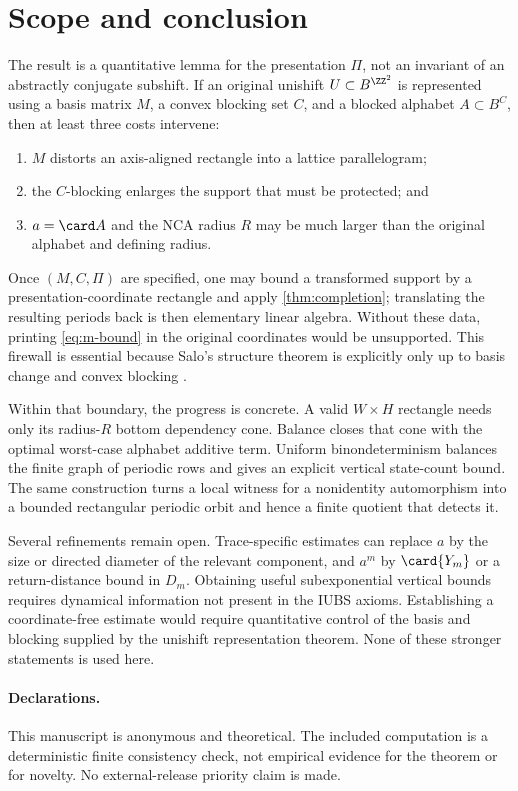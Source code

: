 \section{Scope and conclusion}\label{sec:conclusion}

The result is a quantitative lemma for the presentation $\Pi$, not an invariant of an abstractly conjugate subshift.  If an original unishift $U\subset B^{\ZZ^2}$ is represented using a basis matrix $M$, a convex blocking set $C$, and a blocked alphabet $A\subset B^C$, then at least three costs intervene:
\begin{enumerate}
\item $M$ distorts an axis-aligned rectangle into a lattice parallelogram;
\item the $C$-blocking enlarges the support that must be protected; and
\item $a=\card A$ and the NCA radius $R$ may be much larger than the original alphabet and defining radius.
\end{enumerate}
Once $(M,C,\Pi)$ are specified, one may bound a transformed support by a presentation-coordinate rectangle and apply \cref{thm:completion}; translating the resulting periods back is then elementary linear algebra.  Without these data, printing \eqref{eq:m-bound} in the original coordinates would be unsupported.  This firewall is essential because Salo's structure theorem is explicitly only up to basis change and convex blocking \citep{salo2025iubs}.

Within that boundary, the progress is concrete.  A valid $W\times H$ rectangle needs only its radius-$R$ bottom dependency cone.  Balance closes that cone with the optimal worst-case alphabet additive term.  Uniform binondeterminism balances the finite graph of periodic rows and gives an explicit vertical state-count bound.  The same construction turns a local witness for a nonidentity automorphism into a bounded rectangular periodic orbit and hence a finite quotient that detects it.

Several refinements remain open.  Trace-specific estimates can replace $a$ by the size or directed diameter of the relevant component, and $a^m$ by $\card{Y_m}$ or a return-distance bound in $D_m$.  Obtaining useful subexponential vertical bounds requires dynamical information not present in the IUBS axioms.  Establishing a coordinate-free estimate would require quantitative control of the basis and blocking supplied by the unishift representation theorem.  None of these stronger statements is used here.

\paragraph{Declarations.}
This manuscript is anonymous and theoretical.  The included computation is a deterministic finite consistency check, not empirical evidence for the theorem or for novelty.  No external-release priority claim is made.
